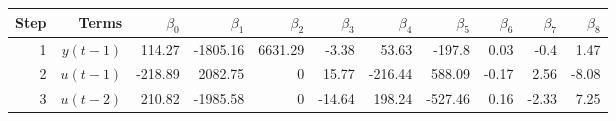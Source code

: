 \begin{tabular}{rrrrrrrrrrr}
Step & Terms & $\beta_{0}$ & $\beta_{1}$ & $\beta_{2}$ & $\beta_{3}$ & $\beta_{4}$ & $\beta_{5}$ & $\beta_{6}$ & $\beta_{7}$ & $\beta_{8}$ \\ 
\hline 
1 & $y(t-1)$ & 114.27 & -1805.16 & 6631.29 & -3.38 & 53.63 & -197.8 & 0.03 & -0.4 & 1.47 \\ 
2 & $u(t-1)$ & -218.89 & 2082.75 & 0 & 15.77 & -216.44 & 588.09 & -0.17 & 2.56 & -8.08 \\ 
3 & $u(t-2)$ & 210.82 & -1985.58 & 0 & -14.64 & 198.24 & -527.46 & 0.16 & -2.33 & 7.25 \\ 
\hline 
\end{tabular}